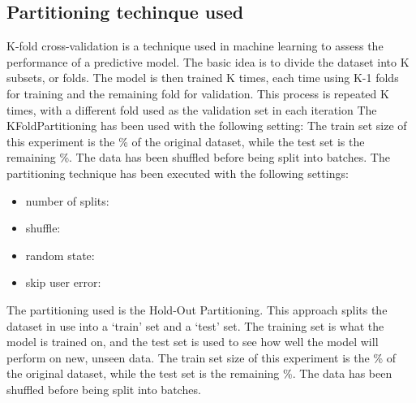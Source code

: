 \documentclass[11pt]{article}
\begin{document}
\hfill\break



\subsection{Partitioning techinque used}\label{subsec:partitioning}
K-fold cross-validation is a technique used in machine learning to assess
the performance of a predictive model. The basic idea is to divide the dataset
into K subsets, or folds. The model is then trained K times, each time using K-1
folds for training and the remaining fold for validation. This process is
repeated K times, with a different fold used as the validation set in each iteration
\hfill\break
\hfill\break
The KFoldPartitioning has been used with the following setting:
\hfill\break
\hfill\break
The train set size of this experiment is the \%
of the original dataset, while the test set is the remaining \%.
\hfill\break
\hfill\break
{}
The data has been shuffled before being split into batches.
The partitioning technique has been executed with the following settings:
\begin{itemize}
    \item number of splits: 
    \item shuffle: 
    \item random state: 
    \item skip user error: 
\end{itemize}

The partitioning used is the Hold-Out Partitioning.
This approach splits the dataset in use into a ‘train’ set and a ‘test’ set.
The training set is what the model is trained on, and the test set is used to see how
well the model will perform on new, unseen data.
\hfill\break
\hfill\break
The train set size of this experiment is the \%
of the original dataset, while the test set is the remaining \%.
\hfill\break
\hfill\break
{}
The data has been shuffled before being split into batches.
\end{document}
